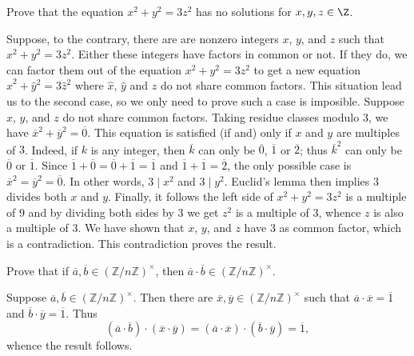 \begin{questions}
\question
    Prove that the equation \(x^2+y^2=3 z^2\) has no solutions for \(x,y,z\in\Z\).
\begin{theproof}%
    Suppose, to the contrary, there are  are nonzero integers  \(x\), \(y\), and \(z\) such that \(x^2 + y^2 = 3 z^2\).
    Either these integers have  factors in common or not.
    If they do, we can factor them out of the equation \(x^2 + y^2 = 3 z^2\) to get a new equation \(\hat{x}^2 + \hat{y}^2 = 3 \hat{z}^2\) where \(\hat{x}\), \(\hat{y}\) and \(\hat{z}\) do not share common factors. This situation lead us to the second case, so we only need to prove such a case is imposible.
    Suppose  \(x\), \(y\), and \(z\) do not share common factors.
    Taking residue classes modulo \(3\), we have \(\overline{x}^2 + \overline{y}^2 = \overline{0}\). This equation is satisfied (if and) only if \(x\) and \(y\) are multiples of \(3\).
    Indeed, if \(k\) is any integer, then \(\overline{k}\) can only be \(\overline{0}\), \(\overline{1}\) or \(\overline{2}\); thus \(\overline{k}^2\) can only be \(\overline{0}\) or \(\overline{1}\). Since \(\overline{1} + \overline{0} = \overline{0} + \overline{1} = \overline{1}\) and \(\overline{1} + \overline{1} = \overline{2}\), the only possible case is \(\overline{x}^2 = \overline{y}^2 = \overline{0}\).
    In other words, \(3\mid x^2\) and \(3\mid y^2\).
    Euclid's lemma then implies \(3\) divides both \(x\) and \(y\). Finally, it follows the left side of \({x}^2 + {y}^2 = 3 {z}^2\) is a multiple of \(9\) and by dividing both sides by \(3\) we get \(z^2\) is a multiple of \(3\), whence \(z\) is also a multiple of \(3\). We have shown that \(x\), \(y\), and \(z\) have  \(3\) as common factor, which is a contradiction. 
    This contradiction proves the result.
\end{theproof}


\question
    Prove that if \(\overline{a}, \overline{b} \in(\mathbb{Z} / n \mathbb{Z})^{\times}\), then \(\overline{a} \cdot \overline{b} \in(\mathbb{Z} / n \mathbb{Z})^{\times}\).
\begin{theproof}
    Suppose \(\overline{a}, \overline{b} \in(\mathbb{Z} / n \mathbb{Z})^{\times}\). Then there are \(\overline{x}, \overline{y} \in(\mathbb{Z} / n \mathbb{Z})^{\times}\) such that \(\overline{a}\cdot \overline{x} = \overline{1}\) and \(\overline{b}\cdot \overline{y} = \overline{1}\). Thus \[(\overline{a}\cdot\overline{b})\cdot (\overline{x}\cdot \overline{y}) = (\overline{a}\cdot \overline{x})\cdot (\overline{b}\cdot \overline{y}) = \overline{1},\]
    whence the result follows.
\end{theproof}



\end{questions}
